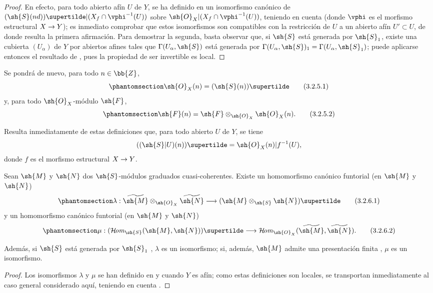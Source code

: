 \documentclass[oneside,10pt]{amsart}
\makeatletter
\newcommand{\ega@arrow}[2]{\mathchoice{#1}{#2}{#2}{#2}}
\renewcommand{\to}{\ega@arrow{\longrightarrow}{\rightarrow}}
\def\shHom{\mathcal{H}\!\mathit{om}}
\let\EGAOriginalLabel\label
\renewcommand{\label}[1]{\phantomsection\EGAOriginalLabel{#1}}
\makeatother
\begin{document}
\begin{proof}
En efecto, para todo abierto afín $U$ de $Y$, se ha definido en  un isomorfismo canónico de $(\sh{S}(nd))\supertilde|(X_f\cap\vphi^{-1}(U))$ sobre $\sh{O}_X|(X_f\cap\vphi^{-1}(U))$, teniendo en cuenta  (donde $\vphi$ es el morfismo estructural $X\to Y$); es inmediato comprobar que estos isomorfismos son compatibles con la restricción de $U$ a un abierto afín $U'\subset U$, de donde resulta la primera afirmación.
Para demostrar la segunda, basta observar que, si $\sh{S}$ está generada por $\sh{S}_1$, existe una cubierta $(U_\alpha)$ de $Y$ por abiertos afines tales que $\Gamma(U_\alpha,\sh{S})$ está generada por $\Gamma(U_\alpha,\sh{S})_1=\Gamma(U_\alpha,\sh{S}_1)$; puede aplicarse entonces el resultado de , pues la propiedad de ser invertible es local.
\end{proof}

Se pondrá de nuevo, para todo $n\in\bb{Z}$,
\[
\label{II.3.2.5.1}
  \sh{O}_X(n)=(\sh{S}(n))\supertilde
\tag{3.2.5.1}
\]
y, para todo $\sh{O}_X$-módulo $\sh{F}$,
\[
\label{II.3.2.5.2}
  \sh{F}(n)=\sh{F}\otimes_{\sh{O}_X}\sh{O}_X(n).
\tag{3.2.5.2}
\]

Resulta inmediatamente de estas definiciones que, para todo abierto $U$ de $Y$, se tiene
\[
  ((\sh{S}|U)(n))\supertilde=\sh{O}_X(n)|f^{-1}(U),
\]
donde $f$ es el morfismo estructural $X\to Y$.

\begin{proposition}[3.2.6]
\label{II.3.2.6}
Sean $\sh{M}$ y $\sh{N}$ dos $\sh{S}$-módulos graduados cuasi-coherentes.
Existe un homomorfismo canónico funtorial (en $\sh{M}$ y $\sh{N}$)
\[
\label{II.3.2.6.1}
  \lambda:\widetilde{\sh{M}}\otimes_{\sh{O}_X}\widetilde{\sh{N}}\to(\sh{M}\otimes_{\sh{S}}\sh{N})\supertilde
\tag{3.2.6.1}
\]
y un homomorfismo canónico funtorial (en $\sh{M}$ y $\sh{N}$)
\[
\label{II.3.2.6.2}
  \mu:(\shHom_{\sh{S}}(\sh{M},\sh{N}))\supertilde\to\shHom_{\sh{O}_X}(\widetilde{\sh{M}},\widetilde{\sh{N}}).
\tag{3.2.6.2}
\]

Además, si $\sh{S}$ está generada por $\sh{S}_1$ , $\lambda$ es un isomorfismo; si, además, $\sh{M}$ admite una presentación finita , $\mu$ es un isomorfismo.
\end{proposition}

\begin{proof}
Los isomorfismos $\lambda$ y $\mu$ se han definido en  y  cuando $Y$ es afín; como estas definiciones son locales, se transportan inmediatamente al caso general considerado aquí, teniendo en cuenta .
\end{proof}
\end{document}
